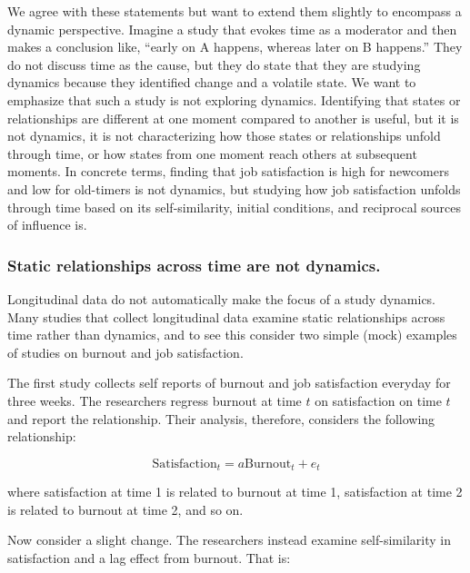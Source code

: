 \documentclass[english,,man]{apa6}
\theoremstyle{definition}
\theoremstyle{definition}
\theoremstyle{definition}
\theoremstyle{remark}
\begin{document}
We agree with these statements but want to extend them slightly to
encompass a dynamic perspective. Imagine a study that evokes time as a
moderator and then makes a conclusion like, \enquote{early on A happens,
whereas later on B happens.} They do not discuss time as the cause, but
they do state that they are studying dynamics because they identified
change and a volatile state. We want to emphasize that such a study is
not exploring dynamics. Identifying that states or relationships are
different at one moment compared to another is useful, but it is not
dynamics, it is not characterizing how those states or relationships
unfold through time, or how states from one moment reach others at
subsequent moments. In concrete terms, finding that job satisfaction is
high for newcomers and low for old-timers is not dynamics, but studying
how job satisfaction unfolds through time based on its self-similarity,
initial conditions, and reciprocal sources of influence is.

\hypertarget{static-relationships-across-time-are-not-dynamics.}{%
\subsubsection{Static relationships across time are not
dynamics.}\label{static-relationships-across-time-are-not-dynamics.}}

Longitudinal data do not automatically make the focus of a study
dynamics. Many studies that collect longitudinal data examine static
relationships across time rather than dynamics, and to see this consider
two simple (mock) examples of studies on burnout and job satisfaction.

The first study collects self reports of burnout and job satisfaction
everyday for three weeks. The researchers regress burnout at time \(t\)
on satisfaction on time \(t\) and report the relationship. Their
analysis, therefore, considers the following relationship:

\begin{equation}
\textrm{Satisfaction}_{t} = a \textrm{Burnout}_{t} + e_{t}
\end{equation}

\noindent where satisfaction at time 1 is related to burnout at time 1,
satisfaction at time 2 is related to burnout at time 2, and so on.

Now consider a slight change. The researchers instead examine
self-similarity in satisfaction and a lag effect from burnout. That is:
\end{document}
